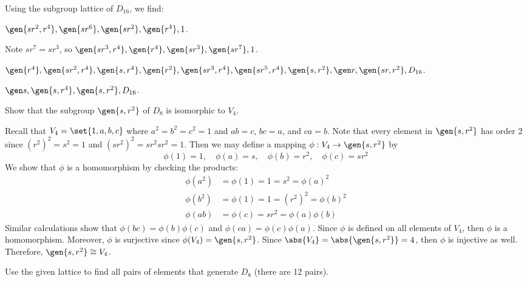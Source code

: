 \begin{sol}
    Using the subgroup lattice of $D_{16}$, we find:
    \begin{subproblems}
        \item $\gen{sr^2, r^4}, \gen {sr^6}, \gen{sr^2}, \gen{r^4}, 1$.
        \item Note $sr^7 = sr^3$, so $\gen{sr^3, r^4}, \gen{r^4}, \gen{sr^3}, \gen{sr^7}, 1$.
        \item $\gen{r^4}, \gen{sr^2, r^4}, \gen{s, r^4}, \gen{r^2}, \gen{sr^3, r^4}, \gen{sr^5, r^4}, \gen{s, r^2}, \gen r, \gen{sr, r^2}, D_{16}$.
        \item $\gen s, \gen{s, r^4}, \gen{s, r^2}, D_{16}$. \qh
    \end{subproblems}
\end{sol}


\begin{exercise}\label{ex2.5.3}
    Show that the subgroup $\gen{s, r^2}$ of $D_8$ is isomorphic to $V_4$.
\end{exercise}

\begin{sol}
    Recall that $V_4 = \set{1, a, b, c}$ where $a^2 = b^2 = c^2 = 1$ and $ab = c$, $bc = a$, and $ca = b$. Note that every element in $\gen{s, r^2}$ has order 2 since $(r^2)^2 = s^2 = 1$ and $(sr^2)^2 = sr^2sr^2 = 1$. Then we may define a mapping $\phi : V_4 \to \gen{s, r^2}$ by
    \[\phi(1) = 1, \quad \phi(a) = s, \quad \phi(b) = r^2, \quad \phi(c) = sr^2\]
    We show that $\phi$ is a homomorphism by checking the products:
    \begin{align*}
        \phi(a^2) & = \phi(1) = 1 = s^2 = \phi(a)^2 \\
        \phi(b^2) & = \phi(1) = 1 = (r^2)^2 = \phi(b)^2 \\
        \phi(ab) & = \phi(c) = sr^2 = \phi(a)\phi(b)
    \end{align*}
    Similar calculations show that $\phi(bc) = \phi(b)\phi(c)$ and $\phi(ca) = \phi(c)\phi(a)$. Since $\phi$ is defined on all elements of $V_4$, then $\phi$ is a homomorphism. Moreover, $\phi$ is surjective since $\phi(V_4) = \gen{s, r^2}$. Since $\abs{V_4} = \abs{\gen{s, r^2}} = 4$, then $\phi$ is injective as well. Therefore, $\gen{s, r^2} \cong V_4$.
\end{sol}

\begin{exercise}\label{ex2.5.4}
    Use the given lattice to find all pairs of elements that generate $D_8$ (there are 12 pairs).
\end{exercise}

